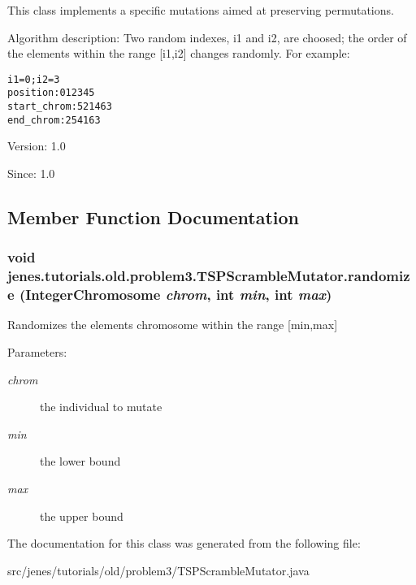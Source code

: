 This class implements a specific mutations aimed at preserving permutations.

Algorithm description: Two random indexes, i1 and i2, are choosed; the order of the elements within the range \mbox{[}i1,i2\mbox{]} changes randomly. For example: \small\begin{alltt}
       i1=0; i2=3
       position:    0 1 2 3 4 5
	 start\_chrom: 5 2 1 4 6 3
       end\_chrom:   2 5 4 1 6 3
 \end{alltt}
\normalsize 


\begin{Desc}
\item[Version:]1.0 \end{Desc}
\begin{Desc}
\item[Since:]1.0 \end{Desc}


\subsection{Member Function Documentation}
\hypertarget{classjenes_1_1tutorials_1_1old_1_1problem3_1_1_t_s_p_scramble_mutator_a32403f391bb9ddffb1145b4d852187d}{
\subsubsection[randomize]{\setlength{\rightskip}{0pt plus 5cm}void jenes.tutorials.old.problem3.TSPScrambleMutator.randomize ({\bf IntegerChromosome} {\em chrom}, \/  int {\em min}, \/  int {\em max})}}
\label{classjenes_1_1tutorials_1_1old_1_1problem3_1_1_t_s_p_scramble_mutator_a32403f391bb9ddffb1145b4d852187d}


Randomizes the elements chromosome within the range \mbox{[}min,max\mbox{]} 

\begin{Desc}
\item[Parameters:]
\begin{description}
\item[{\em chrom}]the individual to mutate \item[{\em min}]the lower bound \item[{\em max}]the upper bound \end{description}
\end{Desc}


The documentation for this class was generated from the following file:\begin{CompactItemize}
\item 
src/jenes/tutorials/old/problem3/TSPScrambleMutator.java\end{CompactItemize}
